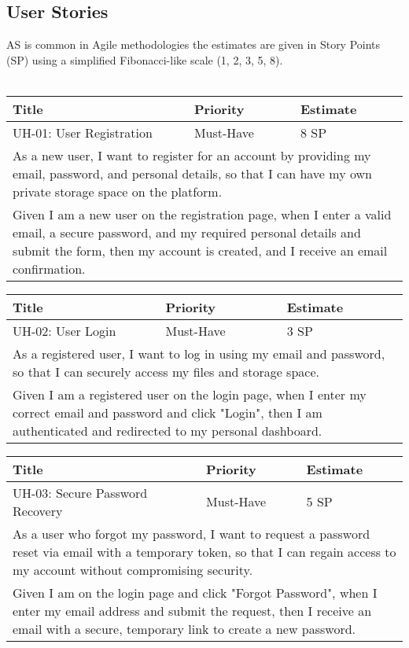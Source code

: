 \subsection*{User Stories}

AS is common in Agile methodologies the estimates are given in Story Points (SP) using a simplified Fibonacci-like scale (1, 2, 3, 5, 8).\\
\\

\begin{tabular}{|p{4cm}|p{5cm}|p{5cm}|}
    \hline
    \textbf{Title} & \textbf{Priority} & \textbf{Estimate} \\
    \hline
    UH-01: User Registration & Must-Have & 8 SP \\
    \hline
    \multicolumn{3}{|p{14cm}|}{As a new user, I want to register for an account by providing my email, password, and personal details, so that I can have my own private storage space on the platform.} \\
    \hline
    \multicolumn{3}{|p{14cm}|}{Given I am a new user on the registration page, when I enter a valid email, a secure password, and my required personal details and submit the form, then my account is created, and I receive an email confirmation.} \\
    \hline
\end{tabular}

\vspace{5mm}
\begin{tabular}{|p{4cm}|p{5cm}|p{5cm}|}
    \hline
    \textbf{Title} & \textbf{Priority} & \textbf{Estimate} \\
    \hline
    UH-02: User Login & Must-Have & 3 SP \\
    \hline
    \multicolumn{3}{|p{14cm}|}{As a registered user, I want to log in using my email and password, so that I can securely access my files and storage space.} \\
    \hline
    \multicolumn{3}{|p{14cm}|}{Given I am a registered user on the login page, when I enter my correct email and password and click "Login", then I am authenticated and redirected to my personal dashboard.} \\
    \hline
\end{tabular}

\vspace{5mm}
\begin{tabular}{|p{4cm}|p{5cm}|p{5cm}|}
    \hline
    \textbf{Title} & \textbf{Priority} & \textbf{Estimate} \\
    \hline
    UH-03: Secure Password Recovery & Must-Have & 5 SP \\
    \hline
    \multicolumn{3}{|p{14cm}|}{As a user who forgot my password, I want to request a password reset via email with a temporary token, so that I can regain access to my account without compromising security.} \\
    \hline
    \multicolumn{3}{|p{14cm}|}{Given I am on the login page and click "Forgot Password", when I enter my email address and submit the request, then I receive an email with a secure, temporary link to create a new password.} \\
    \hline
\end{tabular}

